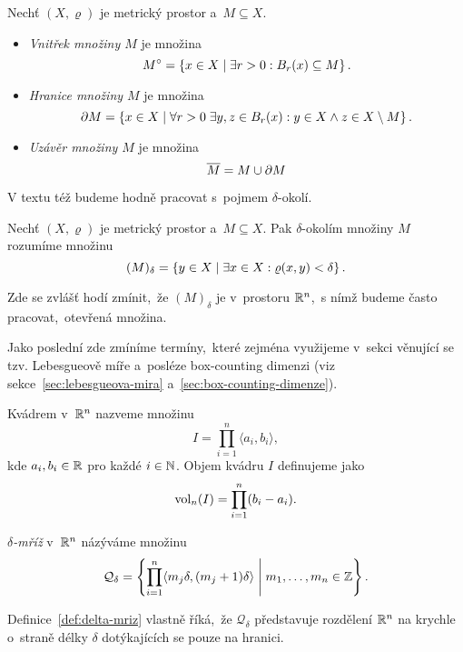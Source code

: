 \begin{definition}\label{def:vnitrek-hranice-uzaver}
    Nechť $(X,\varrho)$ je metrický prostor a~$M\subseteq X$.
    \begin{itemize}
        \item \emph{Vnitřek množiny $M$} je množina
        \[M^\circ=\left\{x\in X\mid \exists r>0: B_r(x)\subseteq M\right\}.\]
        \item \emph{Hranice množiny $M$} je množina
        \[\partial M=\left\{x\in X\mid \forall r>0\;\exists y,z\in B_r(x): y\in X\land z\in X\setminus M\right\}.\]
        \item \emph{Uzávěr množiny $M$} je množina
        \[\overline{M}=M\cup\partial M\]
    \end{itemize}
\end{definition}
V textu též budeme hodně pracovat s~pojmem $\delta$-okolí.
\begin{definition}\label{def:delta-okoli}
    Nechť $(X,\varrho)$ je metrický prostor a~$M\subseteq X$. Pak $\delta$-okolím množiny $M$ rozumíme množinu
    \[(M)_\delta=\left\{y\in X\mid \exists x\in X: \varrho(x,y)<\delta\right\}.\]
\end{definition}
Zde se zvlášť hodí zmínit,~že $(M)_\delta$ je v~prostoru $\mathbb{R}^n$,~s nímž budeme často pracovat,~otevřená množina.

Jako poslední zde zmíníme termíny,~které zejména využijeme v~sekci věnující se tzv. Lebesgueově míře a~posléze box-counting dimenzi (viz sekce~\ref{sec:lebesgueova-mira} a~\ref{sec:box-counting-dimenze}).
\begin{definition}[Kvádr]\label{def:kvadr}
    Kvádrem v~$\mathbb{R}^n$ nazveme množinu
    \[I=\prod_{i=1}^{n}\langle a_i,b_i\rangle,\]
    kde $a_i,b_i\in\mathbb{R}$ pro každé $i\in\mathbb{N}$. Objem kvádru $I$ definujeme jako
    \[\operatorname{vol}_n(I)=\prod_{i=1}^{n}(b_i-a_i).\]
\end{definition}
\begin{definition}\label{def:delta-mriz}
    \emph{$\delta$-mříž} v~$\mathbb{R}^n$ názýváme množinu
    \[\mathcal{Q}_\delta=\left\{\prod_{i=1}^{n}\langle m_j\delta,(m_j+1)\delta\rangle\;\middle|\;m_1,\ldots,m_n\in\mathbb{Z}\right\}.\]
\end{definition}
Definice~\ref{def:delta-mriz} vlastně říká,~že $\mathcal{Q}_\delta$ představuje rozdělení $\mathbb{R}^n$ na krychle o~straně délky $\delta$ dotýkajících se pouze na hranici.

